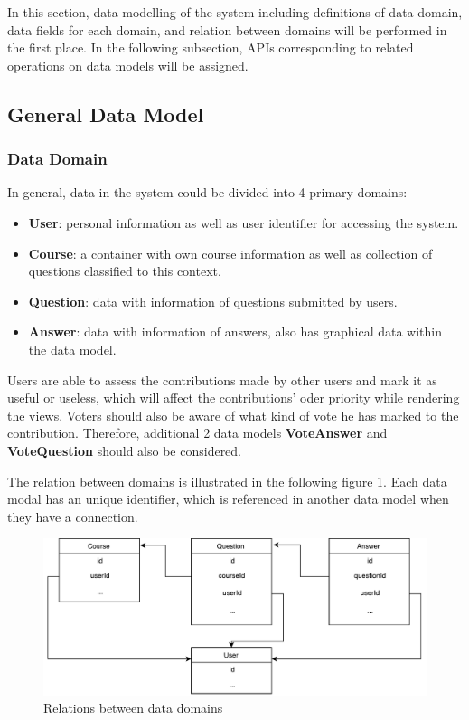 In this section, data modelling of the system including definitions of data domain, data fields for each domain, and relation between domains will be performed in the first place. In the following subsection, APIs corresponding to related operations on data models will be assigned.

\subsection{General Data Model}


\subsubsection{ Data Domain }
In general, data in the system could be divided into 4 primary domains:

\begin{itemize}
\item
\textbf{User}: personal information as well as user identifier for accessing the system.
\item
\textbf{Course}: a container with own course information as well as collection of questions classified to this context.
\item
\textbf{Question}:  data with information of questions submitted by users.
\item
\textbf{Answer}: data with information of answers, also has graphical data within the data model.

\end{itemize}

Users are able to assess the contributions made by other users and mark it as useful or useless, which will affect the contributions' oder priority while rendering the views. Voters should also be aware of what kind of vote he has marked to the contribution. Therefore, additional 2 data models \textbf{VoteAnswer} and \textbf{VoteQuestion} should also be considered. 

The relation between domains is illustrated in the following figure \ref{fig:data-domain-relation}. Each data modal has an unique identifier, which is referenced in another data model when they have a connection. 

\begin{figure}[!htbp]
  \centering
    \includegraphics[width=1\textwidth]{Figures/concept-data-domain-relation.pdf}
  \caption{Relations between data domains}
  \label{fig:data-domain-relation}
\end{figure}


